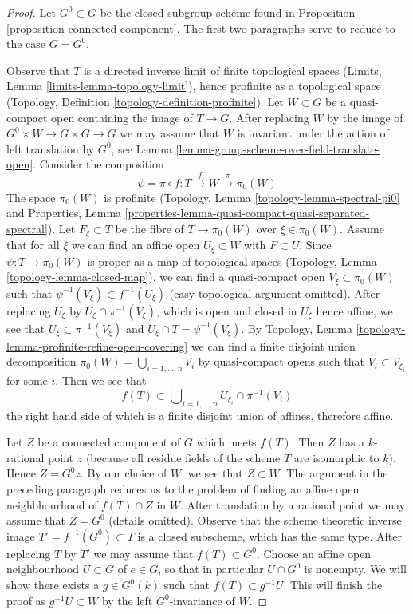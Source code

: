 \begin{proof}
Let $G^0 \subset G$ be the closed subgroup scheme found in
Proposition \ref{proposition-connected-component}. The first two paragraphs
serve to reduce to the case $G = G^0$.

\medskip\noindent
Observe that $T$ is a directed inverse limit of finite topological spaces
(Limits, Lemma \ref{limits-lemma-topology-limit}), hence profinite as a
topological space (Topology, Definition \ref{topology-definition-profinite}).
Let $W \subset G$ be a quasi-compact open containing the image of $T \to G$.
After replacing $W$ by the image of $G^0 \times W \to G \times G \to G$ we may
assume that $W$ is invariant under the action of left translation by $G^0$, see
Lemma \ref{lemma-group-scheme-over-field-translate-open}.
Consider the composition
$$
\psi = \pi \circ f : T \xrightarrow{f} W \xrightarrow{\pi} \pi_0(W)
$$
The space $\pi_0(W)$ is profinite
(Topology, Lemma \ref{topology-lemma-spectral-pi0} and
Properties, Lemma
\ref{properties-lemma-quasi-compact-quasi-separated-spectral}).
Let $F_\xi \subset T$ be the fibre of $T \to \pi_0(W)$ over $\xi \in \pi_0(W)$.
Assume that for all $\xi$ we can find an affine open $U_\xi \subset W$ with
$F \subset U$. Since $\psi : T \to \pi_0(W)$ is proper as a map of
topological spaces (Topology, Lemma \ref{topology-lemma-closed-map}),
we can find a quasi-compact open $V_\xi \subset \pi_0(W)$ such that
$\psi^{-1}(V_\xi) \subset f^{-1}(U_\xi)$ (easy topological argument omitted).
After replacing $U_\xi$ by $U_\xi \cap \pi^{-1}(V_\xi)$, which is open and
closed in $U_\xi$ hence affine, we see that $U_\xi \subset \pi^{-1}(V_\xi)$
and $U_\xi \cap T = \psi^{-1}(V_\xi)$.
By Topology, Lemma \ref{topology-lemma-profinite-refine-open-covering}
we can find a finite disjoint union decomposition
$\pi_0(W) = \bigcup_{i = 1, \ldots, n} V_i$ by quasi-compact opens such that
$V_i \subset V_{\xi_i}$ for some $i$. Then we see that
$$
f(T) \subset \bigcup\nolimits_{i = 1, \ldots, n} U_{\xi_i} \cap \pi^{-1}(V_i)
$$
the right hand side of which is a finite disjoint union of affines, therefore
affine.

\medskip\noindent
Let $Z$ be a connected component of $G$ which meets $f(T)$. Then $Z$
has a $k$-rational point $z$ (because all residue fields of the scheme $T$
are isomorphic to $k$). Hence $Z = G^0 z$. By our choice of $W$, we see
that $Z \subset W$. The argument in the preceding paragraph reduces us to
the problem of finding an affine open neighbhourhood of $f(T) \cap Z$ in $W$.
After translation by a rational point we may assume that $Z = G^0$
(details omitted). Observe that the scheme theoretic inverse image
$T' = f^{-1}(G^0) \subset T$ is a closed subscheme, which has the same type.
After replacing $T$ by $T'$ we may assume that $f(T) \subset G^0$.
Choose an affine open neighbourhood $U \subset G$
of $e \in G$, so that in particular $U \cap G^0$ is nonempty. We will show
there exists a $g \in G^0(k)$ such that $f(T) \subset g^{-1}U$.
This will finish the proof as $g^{-1}U \subset W$ by the left
$G^0$-invariance of $W$.


\end{proof}
